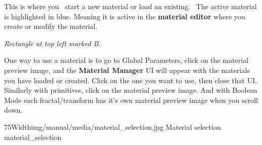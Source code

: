 This is where you~ start a new material or load an
existing.~ The active material is highlighted in blue. Meaning it is active in
the \textbf{material editor} where you create or modify the material.

\emph{Rectangle at top left marked B.}

One way to use a material is to go to Global Parameters,
click on the material preview image, and the \textbf{Material Manager} UI will
appear with the materials you have loaded or created. Click on the one you want
to use, then close that UI.\\ Similarly with primitives, click on the material
preview image. And with Boolean Mode each fractal/transform has it's own
material preview image when you scroll down.

\simpleImageWithCaption75Width{img/manual/media/material_selection.jpg}
{Material selection}
{material_selection}

